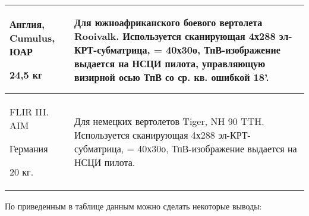 \begin{landscape}
\begin{longtable}{| p{6cm} | p{18cm} |}
	Англия, Cumulus, ЮАР		
	
	24,5 кг 
& 
Для южноафриканского боевого вертолета Rooivalk. Используется сканирующая 4х288 эл-КРТ-субматрица, = 40х30о, ТпВ-изображение выдается на НСЦИ пилота, управляющую визирной осью ТпВ со ср. кв. ошибкой 18'. 
\\ \hline
	FLIR III. AIM	
	
	Германия		
	
	20 кг. 
& 
Для немецких вертолетов Tiger, NH 90 TTH. Используется сканирующая 4х288 эл-КРТ-субматрица, = 40х30о, ТпВ-изображение выдается на НСЦИ пилота. 
\\ \hline

\end{longtable}

\end{landscape}

По приведенным в таблице данным можно сделать некоторые выводы: 

